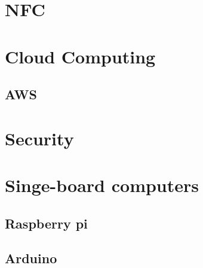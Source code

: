 \documentclass[12pt]{report}
\begin{document}

\section{NFC}


\section{Cloud Computing}



\subsection{AWS}


\section{Security}


\section{Singe-board computers}



\subsection{Raspberry pi}


\subsection{Arduino} %
\end{document}
